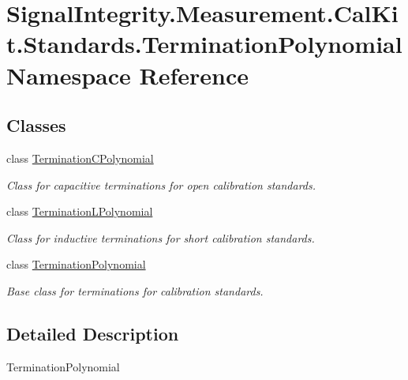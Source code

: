 \hypertarget{namespaceSignalIntegrity_1_1Measurement_1_1CalKit_1_1Standards_1_1TerminationPolynomial}{}\section{Signal\+Integrity.\+Measurement.\+Cal\+Kit.\+Standards.\+Termination\+Polynomial Namespace Reference}
\label{namespaceSignalIntegrity_1_1Measurement_1_1CalKit_1_1Standards_1_1TerminationPolynomial}
\subsection*{Classes}
\begin{DoxyCompactItemize}
\item 
class \hyperlink{classSignalIntegrity_1_1Measurement_1_1CalKit_1_1Standards_1_1TerminationPolynomial_1_1TerminationCPolynomial}{Termination\+C\+Polynomial}
\begin{DoxyCompactList}\small\item\em Class for capacitive terminations for open calibration standards. \end{DoxyCompactList}\item 
class \hyperlink{classSignalIntegrity_1_1Measurement_1_1CalKit_1_1Standards_1_1TerminationPolynomial_1_1TerminationLPolynomial}{Termination\+L\+Polynomial}
\begin{DoxyCompactList}\small\item\em Class for inductive terminations for short calibration standards. \end{DoxyCompactList}\item 
class \hyperlink{classSignalIntegrity_1_1Measurement_1_1CalKit_1_1Standards_1_1TerminationPolynomial_1_1TerminationPolynomial}{Termination\+Polynomial}
\begin{DoxyCompactList}\small\item\em Base class for terminations for calibration standards. \end{DoxyCompactList}\end{DoxyCompactItemize}


\subsection{Detailed Description}
\begin{DoxyVerb}TerminationPolynomial\end{DoxyVerb}
 